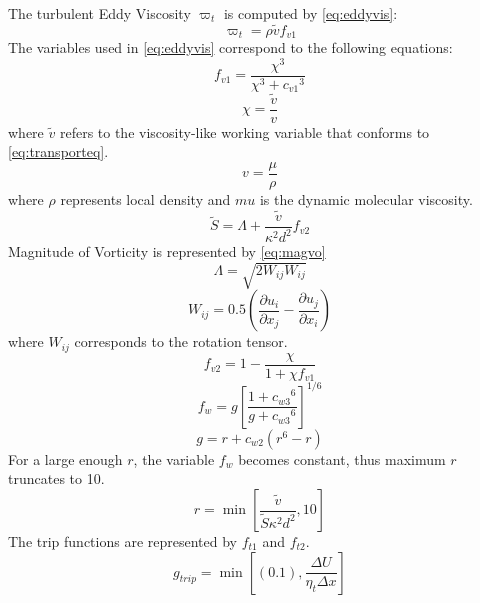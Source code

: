 \documentclass[english]{kththesis}
\begin{document}
The turbulent Eddy Viscosity $\varpi_t$ is computed by \ref{eq:eddyvis}:
\begin{equation}\label{eq:eddyvis}{\varpi _t} = \rho \tilde v{f_{v1}}\end{equation}
The variables used in \ref{eq:eddyvis} correspond to the following equations:
\begin{equation}{f_{v1}} = \frac{{{\chi ^3}}}{{{\chi ^3} + {c_{v1}}^3}}\end{equation}
\begin{equation}\chi  = \frac{{\tilde v}}{v}\end{equation}
where  $\tilde v$ refers to the viscosity-like working variable that conforms to \ref{eq:transporteq}.
\begin{equation}v = \frac{\mu }{\rho }\end{equation}
where $\rho$ represents local density and $mu$ is the dynamic molecular viscosity.
\begin{equation}\tilde S = \Lambda   + \frac{{\tilde v}}{{{\kappa ^2}{d^2}}}{f_{v2}}\end{equation}
Magnitude of Vorticity is represented by \ref{eq:magvo}
\begin{equation}\label{eq:magvo}\Lambda   = \sqrt {2{W_{ij}}{W_{ij}}} \end{equation}
\begin{equation}\label{eq:rotten}{W_{ij}} = {0.5}\left( {\frac{{\partial {u_i}}}{{\partial {x_j}}} - \frac{{\partial {u_j}}}{{\partial {x_i}}}} \right)\end{equation}
where $W_{ij}$ corresponds to the rotation tensor.
\begin{equation}{f_{v2}} = 1 - \frac{\chi }{{1 + \chi {f_{v1}}}}\end{equation}
\begin{equation}{f_w} = g{\left[ {\frac{{1 + {c_{w3}}^6}}{{g + {c_{w3}}^6}}} \right]^{1/6}}\end{equation}
\begin{equation}g = r + {c_{w2}}({r^6} - r)\end{equation}
For a large enough $r$, the variable $f_w$ becomes constant, thus maximum $r$ truncates to 10.
\begin{equation}r = \min \left[ {\frac{{\tilde v}}{{\tilde S{\kappa ^2}{d^2}}},10} \right]\end{equation}
The trip functions are represented by $f_{t1}$ and $f_{t2}$.
\begin{equation} {g_{trip}} = \min \left[ {(0.1),\frac{{\Delta U}}{{{\eta _t}\Delta x}}} \right] \end{equation}
\end{document}
